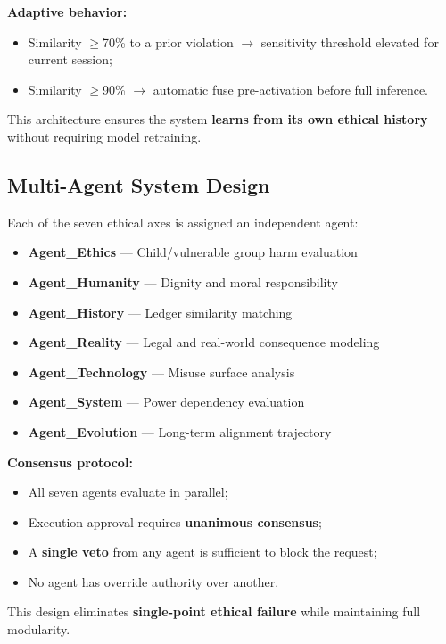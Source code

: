 \documentclass[conference]{IEEEtran}
\begin{document}
\textbf{Adaptive behavior:}
\begin{itemize}
  \item Similarity $\geq$70\% to a prior violation $\to$ sensitivity
        threshold elevated for current session;
  \item Similarity $\geq$90\% $\to$ automatic fuse pre-activation
        before full inference.
\end{itemize}

This architecture ensures the system \textbf{learns from its
own ethical history} without requiring model retraining.

\subsection{Multi-Agent System Design}

Each of the seven ethical axes is assigned an independent
agent:

\begin{itemize}
  \item \textbf{Agent\_Ethics} — Child/vulnerable group harm evaluation
  \item \textbf{Agent\_Humanity} — Dignity and moral responsibility
  \item \textbf{Agent\_History} — Ledger similarity matching
  \item \textbf{Agent\_Reality} — Legal and real-world consequence modeling
  \item \textbf{Agent\_Technology} — Misuse surface analysis
  \item \textbf{Agent\_System} — Power dependency evaluation
  \item \textbf{Agent\_Evolution} — Long-term alignment trajectory
\end{itemize}

\textbf{Consensus protocol:}
\begin{itemize}
  \item All seven agents evaluate in parallel;
  \item Execution approval requires \textbf{unanimous consensus};
  \item A \textbf{single veto} from any agent is sufficient to block
        the request;
  \item No agent has override authority over another.
\end{itemize}

This design eliminates \textbf{single-point ethical failure}
while maintaining full modularity.
\end{document}
